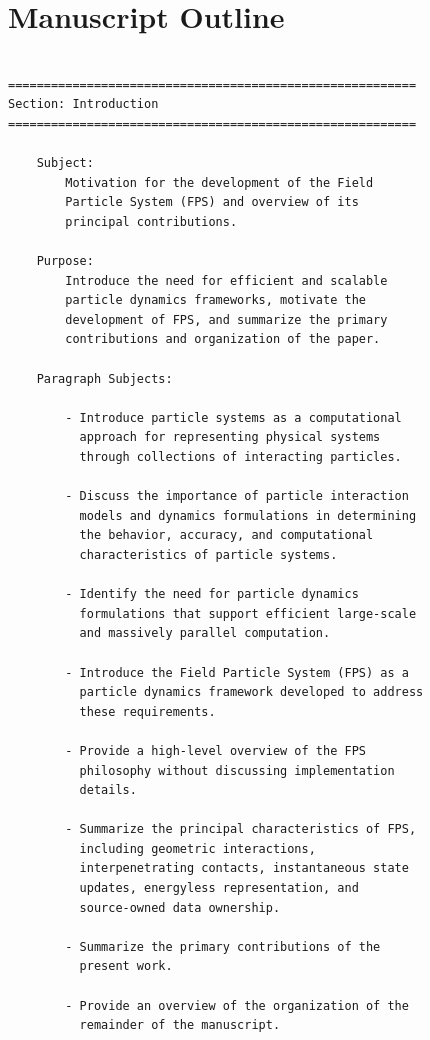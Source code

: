 \newpage
\section{Manuscript Outline}


\begin{verbatim}

=========================================================
Section: Introduction
=========================================================

    Subject:
        Motivation for the development of the Field
        Particle System (FPS) and overview of its
        principal contributions.

    Purpose:
        Introduce the need for efficient and scalable
        particle dynamics frameworks, motivate the
        development of FPS, and summarize the primary
        contributions and organization of the paper.

    Paragraph Subjects:

        - Introduce particle systems as a computational
          approach for representing physical systems
          through collections of interacting particles.

        - Discuss the importance of particle interaction
          models and dynamics formulations in determining
          the behavior, accuracy, and computational
          characteristics of particle systems.

        - Identify the need for particle dynamics
          formulations that support efficient large-scale
          and massively parallel computation.

        - Introduce the Field Particle System (FPS) as a
          particle dynamics framework developed to address
          these requirements.

        - Provide a high-level overview of the FPS
          philosophy without discussing implementation
          details.

        - Summarize the principal characteristics of FPS,
          including geometric interactions,
          interpenetrating contacts, instantaneous state
          updates, energyless representation, and
          source-owned data ownership.

        - Summarize the primary contributions of the
          present work.

        - Provide an overview of the organization of the
          remainder of the manuscript.



\end{verbatim}
